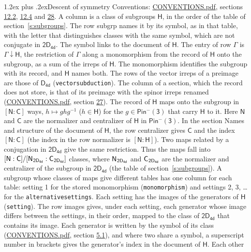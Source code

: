\documentclass[10pt,a4paper]{article}
\makeatletter
\renewcommand\section{\@startsection{section}{1}{\z@}{-3ex plus -1ex minus -.2ex}%
  {1.2ex plus .2ex}{\normalfont\large\sffamily\bfseries\color{parttitle}}}
\numberwithin{equation}{section}
\newcommand{\grp}[1]{\mathsf{#1}}
\newcommand{\grpindex}[2]{[#1 : #2]}
\newcommand{\restr}[2]{#1\!\downarrow#2}
\newcommand{\hairsp}{\mkern1mu}
\makeatother
\begin{document}
\section{Descent of symmetry}\label{s:subduction}
Conventions: \href{../../CONVENTIONS.pdf}{CONVENTIONS.pdf}, sections \href{../../../rotation/CONVENTIONS.pdf\#conv.12.2}{12.2}, \href{../../../rotation/CONVENTIONS.pdf\#conv.12.4}{12.4} and \href{../../CONVENTIONS.pdf\#conv.28}{28}.
A column is a class of subgroups $\grp{H}$, in the order of the table of section~\ref{s:subgroups}. The row subgrp names it by its symbol, as in that table, with the letter that distinguishes classes with the same symbol, which are not conjugate in $\grp{2D_{4d}}$. The symbol links to the document of $\grp{H}$. The entry of row $\Gamma$ is $\restr{\Gamma}{\grp{H}}$, the restriction of $\Gamma$ along a monomorphism from the record of $\grp{H}$ onto the subgroup, as a sum of the irreps of $\grp{H}$. The monomorphism identifies the subgroup with its record, and $\grp{H}$ names both. The rows of the vector irreps of a preimage are those of \href{../../../rotation/data/pdf/D4d.pdf}{$\grp{D_{4d}}$} (\texttt{vectorsubduction}). The column of a section, which the record does not store, is that of its preimage with the spinor irreps renamed (\href{../../CONVENTIONS.pdf}{CONVENTIONS.pdf}, section \href{../../CONVENTIONS.pdf\#conv.27}{27}). \label{n:group.normalizer.o3}\label{n:group.centralizer.o3}\label{n:element.h}The record of $\grp{H}$ maps onto the subgroup in $\grpindex{\grp{N}}{\grp{C}}$ ways, $h \mapsto g h g^{-1}$ ($h \in \grp{H}$) for the $g \in \grp{Pin^{-}(3)}$ that carry $\grp{H}$ to it. Here $\grp{N}$ and $\grp{C}$ are the normalizer and centralizer of $\grp{H}$ in \href{Pinminus3.pdf}{$\grp{Pin^{-}(3)}$}. In the section Names and structure of the document of $\grp{H}$, the row centralizer gives $\grp{C}$ and the index $\grpindex{\grp{N}}{\grp{C}}$ (the index in the row normalizer is $\grpindex{\grp{N}}{\grp{H}}$). Two maps related by a conjugation in $\grp{2D_{4d}}$ give the same restriction. Thus the maps fall into $\grpindex{\grp{N}}{\grp{C}}/\grpindex{\grp{N}_{\hairsp \grp{2D_{4d}}}}{\grp{C}_{\hairsp \grp{2D_{4d}}}}$ classes, where $\grp{N}_{\hairsp \grp{2D_{4d}}}$ and $\grp{C}_{\hairsp \grp{2D_{4d}}}$ are the normalizer and centralizer of the subgroup in $\grp{2D_{4d}}$ (the table of section~\ref{s:subgroups}). \label{n:head.setting}A subgroup whose classes of maps give different tables has one column for each table: setting 1 for the stored monomorphism (\texttt{monomorphism}) and settings 2, 3, \dots{} for the \texttt{alternativesettings}. Each setting has the images of the generators of $\grp{H}$ (\texttt{setting}). \label{n:head.images}The row images gives, under each setting, each generator whose image differs between the settings, in their order, mapped to the class of $\grp{2D_{4d}}$ that contains its image. \label{n:element.generator.index}Each generator is written by the symbol of its class (\href{../../CONVENTIONS.pdf}{CONVENTIONS.pdf}, section \href{../../../rotation/CONVENTIONS.pdf\#conv.5.1}{5.1}), and where two share a symbol, a superscript number in brackets gives the generator's index in the document of $\grp{H}$. \label{n:irrep.Delta}Each other 
\end{document}
